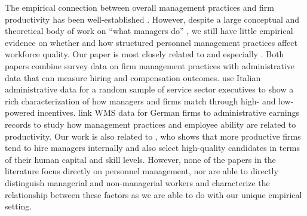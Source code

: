 The empirical connection between overall management practices and firm productivity has been well-established \citep{bloom_india2012, wms_jeea}. However, despite a large conceptual and theoretical body of work on ``what managers do'' \citep{gibbonshenderson_2012}, we still have little empirical evidence on whether and how structured personnel management practices affect workforce quality. Our paper is most closely related to  \citet{Bandiera:Matching:JOLE:2015} and especially \citet{Bender:Management:JOLE:2018}. Both papers combine survey data on firm management practices with administrative data that can measure hiring and compensation outcomes. \citet{Bandiera:Matching:JOLE:2015} use Italian administrative data for a random sample of service sector executives to show a rich characterization of how managers and firms match through high- and low-powered incentives. \citet{Bender:Management:JOLE:2018} link WMS data for German firms to administrative earnings records to study how management practices and employee ability are related to productivity. Our work is also related to \citet{Friedrich2017}, who shows that more productive firms tend to hire managers internally and also select high-quality candidates in terms of their human capital and skill levels. However, none of the papers in the literature focus directly on personnel management, nor are able to directly distinguish managerial and non-managerial workers and characterize the relationship between these factors as we are able to do with our unique empirical setting.


